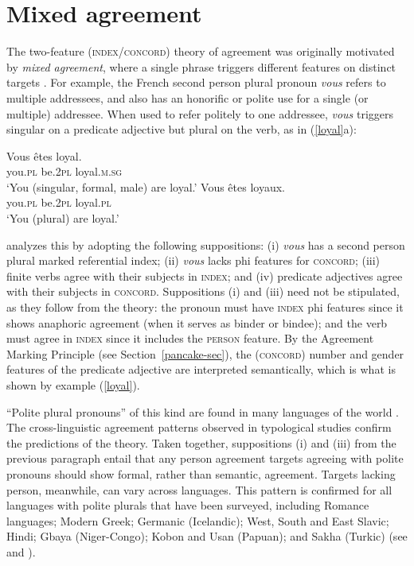 \documentclass[output=paper
                ,modfonts
                ,nonflat
	        ,collection
	        ,collectionchapter
	        ,collectiontoclongg
 	        ,biblatex
                ,babelshorthands
                ,newtxmath
                ,draftmode
                ,colorlinks, citecolor=brown
]{./langsci/langscibook}
\begin{document}
{\section{Mixed agreement}
\label{mismatch}
 

The two-feature (\textsc{index/concord}) theory of agreement was originally motivated by
\textit{mixed agreement}, where a single phrase triggers different features on distinct targets
\parencites[Chapter~2]{Pollard+Sag:1994}{Kathol99b}.  For example, the French second person plural pronoun \textit{vous} refers to multiple addressees, and also has an honorific or polite use for a single (or multiple) addressee.  When used to refer politely to one addressee, \textit{vous} triggers singular on a predicate adjective but plural on the verb, as in (\ref{loyal}a):

\begin{exe} 
\ex\label{loyal}
\begin{xlist}
\ex
\gll   Vous		\^{e}tes		loyal. \\
		you.\textsc{pl}		be.\textsc{2pl}	loyal.\textsc{m.sg} \\
\glt		`You (singular, formal, male) are loyal.’ 
\ex 
\gll	Vous		\^{e}tes		loyaux. \\
		you.\textsc{pl}		be.\textsc{2pl}	loyal.\textsc{pl} \\
\glt		`You (plural) are loyal.’  
\end{xlist}
\end{exe}

\noindent
\citet{Wechsler:2011} analyzes this by adopting the following suppositions: (i) \textit{vous} has a  second person plural marked referential index; (ii) \textit{vous} lacks phi features for \textsc{concord}; (iii) finite verbs agree with their subjects in \textsc{index}; and (iv) predicate adjectives agree with their subjects in \textsc{concord}.  Suppositions (i) and (iii) need not be stipulated, as they follow from the theory:  the pronoun must have \textsc{index} phi features since it shows anaphoric agreement (when it serves as binder or bindee); and the verb must agree in \textsc{index} since it includes the \textsc{person} feature.  By the Agreement Marking Principle (see Section~\ref{pancake-sec}), the (\textsc{concord}) number and gender features of the predicate adjective are interpreted semantically, which is what is shown by example (\ref{loyal}). 

``Polite plural pronouns'' of this kind are found in many languages of the world \citep{Head:1978}.   The cross-linguistic agreement patterns observed in typological studies \citep{Comrie:1975,Wechsler:2011} confirm the predictions of the theory.  Taken together, suppositions (i) and (iii) from the previous paragraph entail that any person agreement targets agreeing with polite pronouns should show formal, rather than semantic, agreement.  Targets lacking person, meanwhile, can vary across languages.  This pattern is confirmed for all languages with polite plurals that have been surveyed, including Romance languages; Modern Greek; Germanic (Icelandic); West, South and East Slavic; Hindi; Gbaya (Niger-Congo);  Kobon and Usan (Papuan); and Sakha (Turkic) (see \citealt{Comrie:1975} and \citealt{Wechsler:2011}).   
 
}
\end{document}
